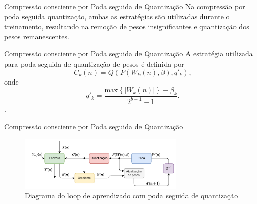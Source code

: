 \begin{frame}{Compressão consciente por Poda seguida de Quantização}
    Na compressão por poda seguida quantização, ambas as estratégias são utilizadas durante o treinamento, resultando na remoção de pesos insignificantes e quantização dos pesos remanescentes.
    
\end{frame}


\begin{frame}{Compressão consciente por Poda seguida de Quantização}
    A estratégia utilizada para poda seguida de quantização de pesos é definida por 
    \begin{equation}\label{EqPruningQuantization}
    C_k(n) = Q\left (  P \left ( W_k(n) , \beta \right ), q'_k \right),
    \end{equation}
    onde
    \begin{equation}
    q'_k = \frac{\text{max} \left \{ \left | W_k(n) \right | \right \} - \beta_k }{2^{b-1}-1}.
    \end{equation}.

\end{frame}

\begin{frame}{Compressão consciente por Poda seguida de Quantização}
    \begin{figure}[H]
    \centering
    \includegraphics[width=0.7\textwidth]{figuras/prunequant_scheme.pdf}
    \caption{Diagrama do loop de aprendizado com poda seguida de quantização}
    \end{figure}
\end{frame}

